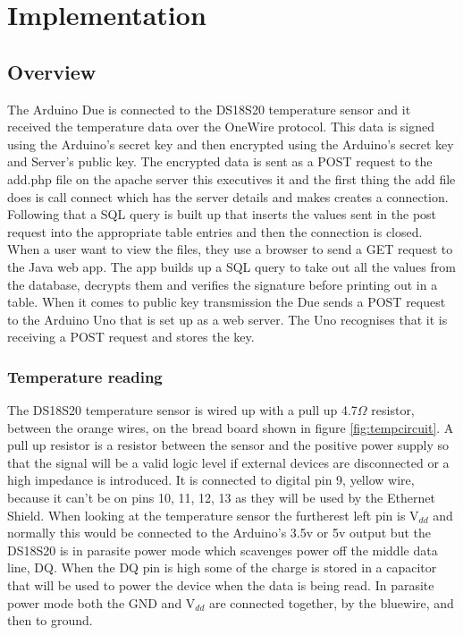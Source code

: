 
\chapter{Implementation}
\label{imple}

\section{Overview}

The Arduino Due is connected to the DS18S20 temperature sensor and it received the temperature data over the OneWire protocol. This data is signed using the Arduino's secret key and then encrypted using the Arduino's secret key and Server's public key. The encrypted data is sent as a POST request to the add.php file on the apache server this executives it and the first thing the add file does is call connect which has the server details and makes creates a connection. Following that a SQL query is built up that inserts the values sent in the post request into the appropriate table entries and then the connection is closed.
When a user want to view the files, they use a browser to send a GET request to the Java web app. The app builds up a SQL query to take out all the values from the database, decrypts them and verifies the signature before printing out in a table.
When it comes to public key transmission the Due sends a POST request to the Arduino Uno that is set up as a web server. The Uno recognises that it is receiving a POST request and stores the key.


\subsection{Temperature reading}

The DS18S20 temperature sensor is wired up with a pull up 4.7$\Omega$ resistor, between the orange wires, on the bread board shown in figure \ref{fig:tempcircuit}. A pull up resistor is a resistor between the sensor and the positive power supply so that the signal will be a valid logic level if external devices are disconnected or a high impedance is introduced. It is connected to digital pin 9, yellow wire, because it can't be on pins 10, 11, 12, 13 as they will be used by the Ethernet Shield. When looking at the temperature sensor the furtherest left pin is V$_{dd}$ and normally this would be connected to the Arduino's 3.5v or 5v output but the DS18S20 is in parasite power mode which scavenges power off the middle data line, DQ. When the DQ pin is high some of the charge is stored in a capacitor that will be used to power the device when the data is being read. In parasite power mode both the GND and V$_{dd}$ are connected together, by the bluewire, and then to ground.

